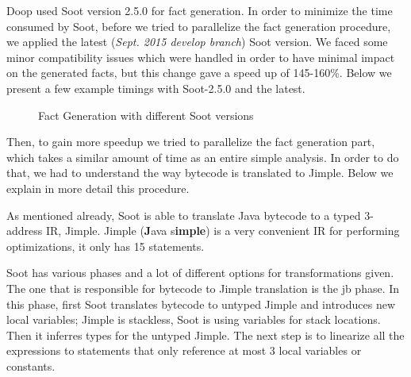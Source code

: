 \documentclass{dithesis}
\begin{document}
    	Doop used Soot version 2.5.0 for fact generation. In order to minimize the time consumed by Soot, before we tried to parallelize the fact generation procedure, we applied the latest (\textit{Sept. 2015 develop branch}) Soot version. We faced some minor compatibility issues which were handled in order to have minimal impact on the generated facts, but this change gave a speed up of 145-160\%. Below we present a few example timings with Soot-2.5.0 and the latest.

		\begin{figure}[H]
			\centering
{}
			\caption{Fact Generation with different Soot versions}
		\end{figure}

    	Then, to gain more speedup we tried to parallelize the fact generation part, which takes a similar amount of time as an entire simple analysis. In order to do that, we had to understand the way bytecode is translated to Jimple. Below we explain in more detail this procedure.

        As mentioned already, Soot is able to translate Java bytecode to a typed 3-address IR, Jimple. Jimple (\textbf{J}ava s\textbf{imple}) is a very convenient IR for performing optimizations, it only has 15 statements.

        Soot has various phases and a lot of different options for transformations given. The one that is responsible for bytecode to Jimple translation is the jb phase. In this phase, first Soot translates bytecode to untyped Jimple and introduces new local variables; Jimple is stackless, Soot is using variables for stack locations. Then it inferres types for the untyped Jimple. The next step is to linearize all the expressions to statements that only reference at most 3 local variables or constants.
\end{document}
